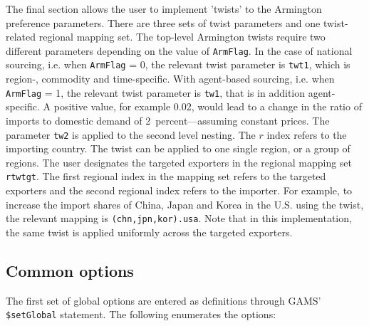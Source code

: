 The final section allows the user to implement 'twists' to the Armington
preference parameters. There are three sets of twist parameters and one
twist-related regional mapping set. The top-level Armington twists require two
different parameters depending on the value of \texttt{ArmFlag}. In the case of
national sourcing, i.e. when \texttt{ArmFlag} = 0, the relevant twist parameter
is \texttt{twt1}, which is region-, commodity and time-specific. With
agent-based sourcing, i.e. when \texttt{ArmFlag} = 1, the relevant twist
parameter is \texttt{tw1}, that is in addition agent-specific. A positive value,
for example 0.02, would lead to a change in the ratio of imports to domestic
demand of 2~percent---assuming constant prices. The parameter \texttt{tw2} is
applied to the second level nesting. The $r$ index refers to the importing
country. The twist can be applied to one single region, or a group of regions.
The user designates the targeted exporters in the regional mapping set
\texttt{rtwtgt}. The first regional index in the mapping set refers to the
targeted exporters and the second regional index refers to the importer. For
example, to increase the import shares of China, Japan and Korea in the U.S.
using the twist, the relevant mapping is \texttt{(chn,jpn,kor).usa}. Note that
in this implementation, the same twist is applied uniformly across the targeted
exporters.

\subsection{Common options}

The first set of global options are entered as definitions through GAMS'
\texttt{\$setGlobal} statement. The following enumerates the options:

